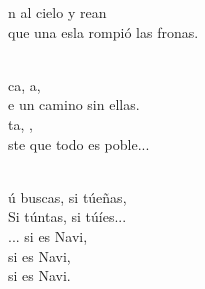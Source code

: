 \documentclass[12pt]{article}
\begin{document}
\begin{multicols*}{2}
\begin{cancion}
	n al cielo y rean \\
	que una esla rompió las fronas. \\\jump\\
	\begin{chorus}%
	ca, a, \\
	e un camino sin ellas. \\
	ta, , \\
	ste que todo es poble... \\
	\end{chorus}%
	\jump\\
	ú buscas, si túeñas,  \\
	Si túntas, si túíes... \\
	... si es Navi,  \\
	si es Navi,  \\
	si es Navi.\\
\end{cancion}%


\end{multicols*}
\end{document}
